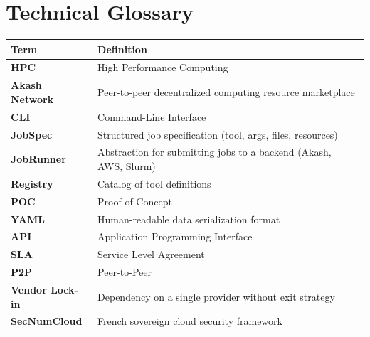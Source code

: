 \documentclass[11pt,a4paper]{article}
\begin{document}
	\vspace{1cm}
	
	\noindent{}
	
	\newpage
	
	\appendix
	
	\section{Technical Glossary}
	
	\begin{tabularx}{\linewidth}{l X}
		\toprule
		\textbf{Term} & \textbf{Definition} \\
		\midrule
		\textbf{HPC} & High Performance Computing \\
		\textbf{Akash Network} & Peer-to-peer decentralized computing resource marketplace \\
		\textbf{CLI} & Command-Line Interface \\
		\textbf{JobSpec} & Structured job specification (tool, args, files, resources) \\
		\textbf{JobRunner} & Abstraction for submitting jobs to a backend (Akash, AWS, Slurm) \\
		\textbf{Registry} & Catalog of tool definitions \\
		\textbf{POC} & Proof of Concept \\
		\textbf{YAML} & Human-readable data serialization format \\
		\textbf{API} & Application Programming Interface \\
		\textbf{SLA} & Service Level Agreement \\
		\textbf{P2P} & Peer-to-Peer \\
		\textbf{Vendor Lock-in} & Dependency on a single provider without exit strategy \\
		\textbf{SecNumCloud} & French sovereign cloud security framework \\
		\bottomrule
	\end{tabularx}
	
\end{document}
